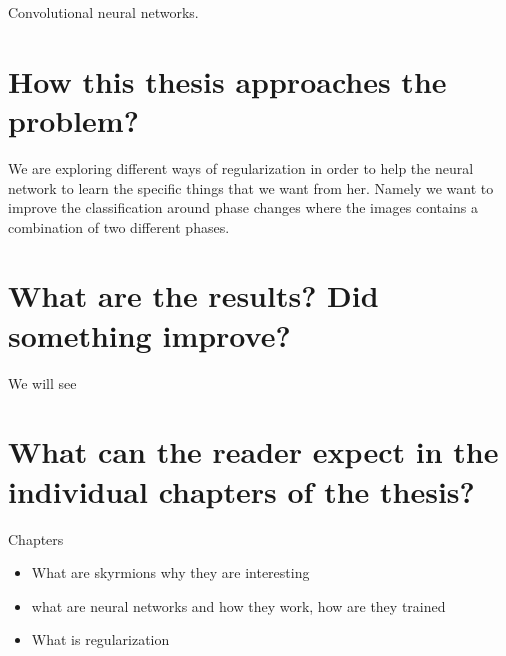 Convolutional neural networks.

\section{How this thesis approaches the problem?}

We are exploring different ways of regularization in order to help the neural network to learn the specific things that we want from her. Namely we want to improve the classification around phase changes where the images contains a combination of two different phases.

\section{What are the results? Did something improve?}

We will see

\section{What can the reader expect in the individual chapters of the thesis?}



Chapters
\begin{itemize}
	\item What are skyrmions why they are interesting
	\item what are neural networks and how they work, how are they trained
	\item What is regularization 
		
\end{itemize}

